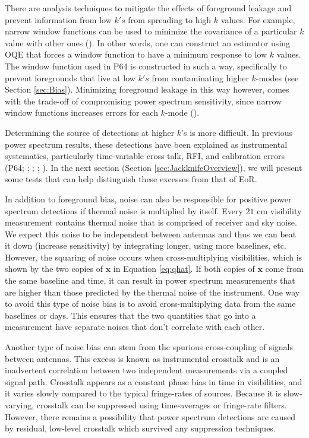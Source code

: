 \documentclass[preprint2,numberedappendix,tighten]{aastex6}  %
\begin{document}
There are analysis techniques to mitigate the effects of foreground leakage and prevent information from low $k's$ from 
spreading to high $k$ values. For example, narrow window functions can be used to minimize the covariance of a particular 
$k$ value with other ones (\citealt{liu_et_al2014b}). In other words, one can construct an estimator using OQE that forces a 
window function to have a minimum response to low $k$ values. The window function used in P64 is constructed in such a way, 
specifically to prevent foregrounds that live at low $k's$ from contaminating higher $k$-modes (see Section \ref{sec:Bias}). 
Minimizing foreground leakage in this way however, comes with the trade-off of compromising power spectrum sensitivity, since 
narrow window functions increases errors for each $k$-mode (\citealt{liu_et_al2014b}). 

Determining the source of detections at higher $k$'s is more difficult. In previous power spectrum results, these detections have been explained as instrumental systematics, particularly time-variable cross talk, RFI, and calibration errors (P64; \citealt{parsons_et_al2014}; \citealt{dillon_et_al2014}; \citealt{beardsley_et_al2016}; \citealt{patil_et_al2017}). In the next section (Section \ref{sec:JackknifeOverview}), we will present some tests that can help distinguish these excesses from that of EoR. 

In addition to foreground bias, noise can also be responsible for positive power spectrum detections if thermal noise is 
multiplied by itself. Every $21$ cm visibility measurement contains thermal noise that is comprised of receiver and sky noise. 
We expect this noise to be independent between antennas and thus we can beat it down (increase sensitivity) by integrating 
longer, using more baselines, etc. However, the squaring of noise occurs when cross-multiplying visibilities, which is shown by 
the two copies of $\textbf{x}$ in Equation \eqref{eq:qhat}. If both copies of $\textbf{x}$ come from the same baseline and time, it 
can result in power spectrum measurements that are higher than those predicted by the thermal noise of the instrument. One 
way to avoid this type of noise bias is to avoid cross-multiplying data from the same baselines or days. This ensures that the 
two quantities that go into a measurement have separate noises that don't correlate with each other. 

Another type of noise bias can stem from the spurious cross-coupling of signals between antennas. This excess is known as 
instrumental crosstalk and is an inadvertent correlation between two independent measurements via a coupled signal path. 
Crosstalk appears as a constant phase bias in time in visibilities, and it varies slowly compared to the typical fringe-rates of 
sources. Because it is slow-varying, crosstalk can be suppressed using time-averages or fringe-rate filters. However, there 
remains a possibility that power spectrum detections are caused by residual, low-level crosstalk which survived any 
suppression techniques. 
\end{document}
